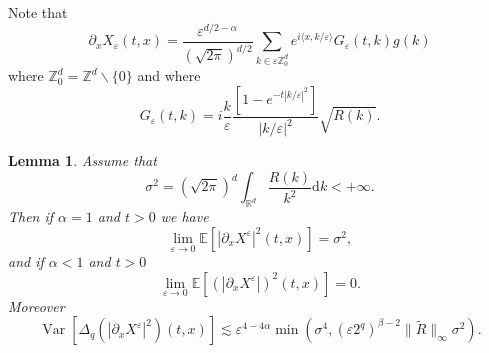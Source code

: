 \documentclass[a4paper,11pt]{article}
\newcommand{\mathd}{\mathrm{d}}
\newcommand{\tmop}[1]{\ensuremath{\operatorname{#1}}}
\newtheorem{lemma}{Lemma}
{\theorembodyfont{\rmfamily}\newtheorem{remark}{Remark}}
\begin{document}
Note that
\begin{equation} \label{eq:formula-X}
  \partial_x X_{\varepsilon} (t, x) = \frac{\varepsilon^{d / 2 -
  \alpha}}{( \sqrt{2 \pi} )^{d / 2}} \sum_{k \in \varepsilon
  \mathbb{Z}^d_0} e^{i \langle x, k / \varepsilon \rangle} G_{\varepsilon}
  (t, k) g (k)
\end{equation}
where $\mathbb{Z}^d_0 =\mathbb{Z}^d \backslash \{ 0 \}$ and where
\[ G_{\varepsilon} (t, k) = i \frac{k}{\varepsilon} \frac{[1 - e^{- t | k /
   \varepsilon |^2}]}{| k / \varepsilon |^2} \sqrt{R (k)} . \]
\begin{lemma}
  Assume that
  \[ \sigma^2 = ( \sqrt{2 \pi} )^d \int_{\mathbb{R}^d} \frac{R
     (k)}{k^2} \mathd k < + \infty . \]
  Then if $\alpha = 1$ and $t>0$ we have
  \[ \lim_{\varepsilon \rightarrow 0} \mathbb{E} [| \partial_x
     X^{\varepsilon} |^2 (t, x)] = \sigma^2, \]
  and if $\alpha < 1$ and $t>0$
  \[ \lim_{\varepsilon \rightarrow 0} \mathbb{E} [(| \partial_x
     X^{\varepsilon} |)^2 (t, x)] = 0. \]
  Moreover 
  \[ \tmop{Var} [\Delta_q (| \partial_x X^{\varepsilon} |^2) (t, x)] \lesssim \varepsilon^{4 - 4 \alpha} \min(\sigma^4,  (\varepsilon 2^q)^{\beta - 2}  \| \tilde R \|_{\infty} \sigma^2)
     . \]
\end{lemma}
\end{document}
